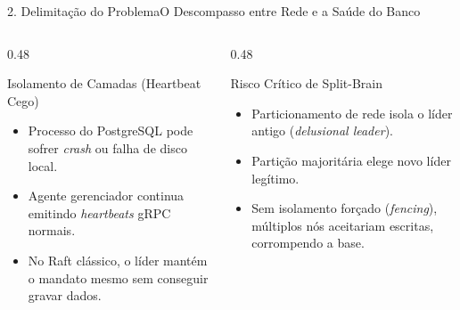 \documentclass[aspectratio=169,10pt]{beamer}
\begin{document}
\begin{frame}{2. Delimitação do Problema}{O Descompasso entre Rede e a Saúde do Banco}
  \begin{columns}[t]
    \begin{column}{0.48\textwidth}
      \begin{alertblock}{Isolamento de Camadas (Heartbeat Cego)}
        \begin{itemize}
          \item Processo do PostgreSQL pode sofrer \textit{crash} ou falha de disco local.
          \item Agente gerenciador continua emitindo \textit{heartbeats} gRPC normais.
          \item No Raft clássico, o líder mantém o mandato mesmo sem conseguir gravar dados.
        \end{itemize}
      \end{alertblock}
    \end{column}
    \begin{column}{0.48\textwidth}
      \begin{alertblock}{Risco Crítico de Split-Brain}
        \begin{itemize}
          \item Particionamento de rede isola o líder antigo (\textit{delusional leader}).
          \item Partição majoritária elege novo líder legítimo.
          \item Sem isolamento forçado (\textit{fencing}), múltiplos nós aceitariam escritas, corrompendo a base.
        \end{itemize}
      \end{alertblock}
    \end{column}
  \end{columns}
\end{frame}
\end{document}
